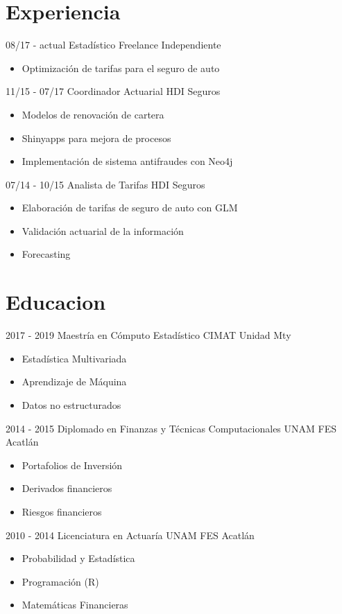 \documentclass[]{friggeri-cv}
\begin{document}
\section{Experiencia}
\begin{entrylist}
  \entry
    {08/17 - actual}
    {Estadístico Freelance}
    {Independiente}
    { \begin{itemize}
         \item Optimización de tarifas para el seguro de auto
      \end{itemize}     }
  \entry
    {11/15 - 07/17}
    {Coordinador Actuarial}
    {HDI Seguros}
    { \begin{itemize}
    
        \item Modelos de renovación de cartera
        \item Shinyapps para mejora de procesos
        \item Implementación de sistema antifraudes con Neo4j
      \end{itemize}       
       }
  \entry
    {07/14 - 10/15}
    {Analista de Tarifas}
    {HDI Seguros}
    { \begin{itemize}
         \item Elaboración de tarifas de seguro de auto con GLM    
         \item Validación actuarial de la información
         \item Forecasting
      \end{itemize}     
     }
    
\end{entrylist}

\section{Educacion}
\begin{entrylist}
  \entry
    {2017 - 2019}
    {Maestría en Cómputo Estadístico}
    {CIMAT Unidad Mty}
    {\begin{itemize}
      \item  Estadística Multivariada
      \item  Aprendizaje de Máquina
      \item  Datos no estructurados
    \end{itemize}}
  \entry
    {2014 - 2015}
    {Diplomado en Finanzas y Técnicas Computacionales}
    {UNAM FES Acatlán}
	{\begin{itemize}
	  \item Portafolios de Inversión
	  \item Derivados financieros
	  \item Riesgos financieros
	\end{itemize} } 
  \entry
    {2010 - 2014}
    {Licenciatura en Actuaría}
    {UNAM FES Acatlán}
    {\begin{itemize}
      \item Probabilidad y Estadística
      \item Programación (R)
      \item Matemáticas Financieras
    \end{itemize}}
\end{entrylist}
\\
\end{document}
